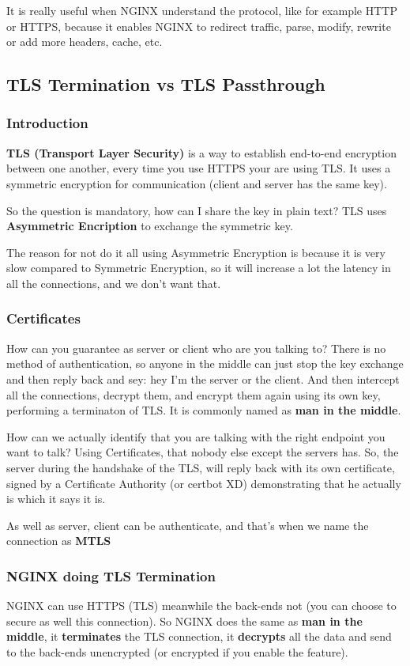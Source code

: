 \documentclass{article}
\begin{document}
It is really useful when NGINX understand the protocol, like for example HTTP or HTTPS, because it enables NGINX to redirect traffic, parse, modify, rewrite or add more headers, cache, etc.

\subsection{TLS Termination vs TLS Passthrough}

\subsubsection{Introduction}

\textbf{TLS (Transport Layer Security)} is a way to establish end-to-end encryption between one another, every time you use HTTPS your are using TLS. It uses a symmetric encryption for communication (client and server has the same key).

So the question is mandatory, how can I share the key in plain text? TLS uses \textbf{Asymmetric Encription} to exchange the symmetric key.

The reason for not do it all using Asymmetric Encryption is because it is very slow compared to Symmetric Encryption, so it will increase a lot the latency in all the connections, and we don't want that.

\subsubsection{Certificates}
How can you guarantee as server or client who are you talking to? There is no method of authentication, so anyone in the middle can just stop the key exchange and then reply back and sey: hey I'm the server or the client. And then intercept all the connections, decrypt them, and encrypt them again using its own key, performing a terminaton of TLS. It is commonly named as \textbf{man in the middle}.

How can we actually identify that you are talking with the right endpoint you want to talk? Using Certificates, that nobody else except the servers has. So, the server during the handshake of the TLS, will reply back with its own certificate, signed by a Certificate Authority (or certbot XD) demonstrating that he actually is which it says it is. 

As well as server, client can be authenticate, and that's when we name the connection as \textbf{MTLS}

\subsubsection{NGINX doing TLS Termination}
NGINX can use HTTPS (TLS) meanwhile the back-ends not (you can choose to secure as well this connection). So NGINX does the same as \textbf{man in the middle}, it \textbf{terminates} the TLS connection, it \textbf{decrypts} all the data and send to the back-ends unencrypted (or encrypted if you enable the feature). 
\end{document}
